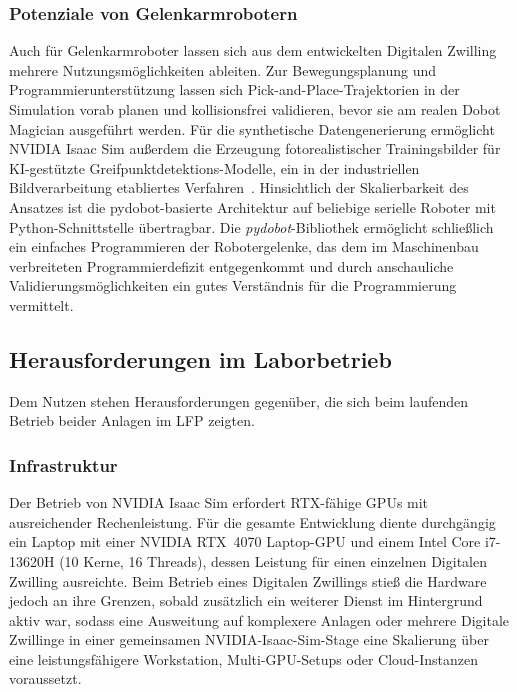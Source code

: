 \subsubsection{Potenziale von Gelenkarmrobotern}
Auch für Gelenkarmroboter lassen sich aus dem entwickelten Digitalen Zwilling mehrere Nutzungsmöglichkeiten ableiten.
Zur Bewegungsplanung und Programmierunterstützung lassen sich Pick-and-Place-Trajektorien in der Simulation vorab planen und kollisionsfrei validieren, bevor sie am realen Dobot Magician ausgeführt werden.
Für die synthetische Datengenerierung ermöglicht NVIDIA Isaac Sim außerdem die Erzeugung fotorealistischer Trainingsbilder für KI-gestützte Greifpunktdetektions-Modelle, ein in der industriellen Bildverarbeitung etabliertes Verfahren~\cite{mdpi2025isaac}.
Hinsichtlich der Skalierbarkeit des Ansatzes ist die pydobot-basierte Architektur auf beliebige serielle Roboter mit Python-Schnittstelle übertragbar.
Die \emph{pydobot}-Bibliothek ermöglicht schließlich ein einfaches Programmieren der Robotergelenke, das dem im Maschinenbau verbreiteten Programmierdefizit entgegenkommt und durch anschauliche Validierungsmöglichkeiten ein gutes Verständnis für die Programmierung vermittelt.

\subsection{Herausforderungen im Laborbetrieb}

Dem Nutzen stehen Herausforderungen gegenüber, die sich beim laufenden Betrieb beider Anlagen im LFP zeigten.

\subsubsection{Infrastruktur}
Der Betrieb von NVIDIA Isaac Sim erfordert RTX-fähige GPUs mit ausreichender Rechenleistung. Für die gesamte Entwicklung diente durchgängig ein Laptop mit einer NVIDIA RTX~4070 Laptop-GPU und einem Intel Core i7-13620H (10 Kerne, 16 Threads), dessen Leistung für einen einzelnen Digitalen Zwilling ausreichte.
Beim Betrieb eines Digitalen Zwillings stieß die Hardware jedoch an ihre Grenzen, sobald zusätzlich ein weiterer Dienst im Hintergrund aktiv war, sodass eine Ausweitung auf komplexere Anlagen oder mehrere Digitale Zwillinge in einer gemeinsamen NVIDIA-Isaac-Sim-Stage eine Skalierung über eine leistungsfähigere Workstation, Multi-GPU-Setups oder Cloud-Instanzen voraussetzt.

